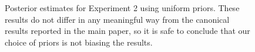 \documentclass[doc,biblatex]{apa7}
\begin{document}
\begin{figure}
\vspace*{2pt}
\caption{Posterior estimates for Experiment 2 using uniform priors. These results do not differ in any meaningful way from the canonical results reported in the main paper, so it is safe to conclude that our choice of priors is not biasing the results.}
\label{supp3}
\end{figure}

\clearpage
\end{document}
